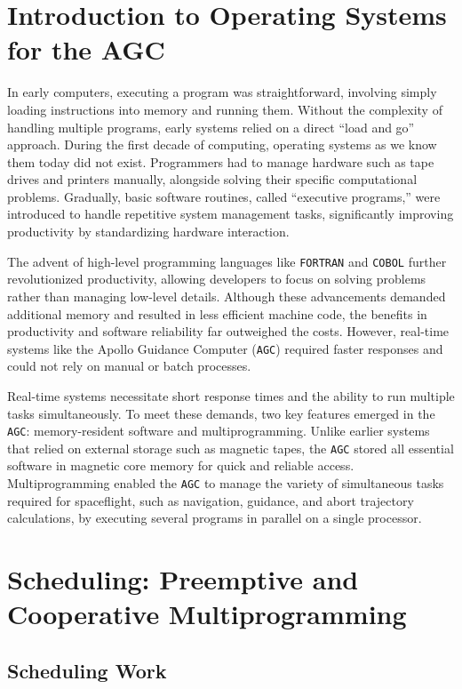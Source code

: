 \documentclass[refcap, oxford]{ahsan}
\begin{document}
\fi     

\section{Introduction to Operating Systems for the AGC}

In early computers, executing a program was straightforward, involving simply loading instructions into memory and running them. Without the complexity of handling multiple programs, early systems relied on a direct ``load and go'' approach. During the first decade of computing, operating systems as we know them today did not exist. Programmers had to manage hardware such as tape drives and printers manually, alongside solving their specific computational problems. Gradually, basic software routines, called ``executive programs,'' were introduced to handle repetitive system management tasks, significantly improving productivity by standardizing hardware interaction.

The advent of high-level programming languages like \texttt{FORTRAN} and \texttt{COBOL} further revolutionized productivity, allowing developers to focus on solving problems rather than managing low-level details. Although these advancements demanded additional memory and resulted in less efficient machine code, the benefits in productivity and software reliability far outweighed the costs. However, real-time systems like the Apollo Guidance Computer (\texttt{AGC}) required faster responses and could not rely on manual or batch processes. 

Real-time systems necessitate short response times and the ability to run multiple tasks simultaneously. To meet these demands, two key features emerged in the \texttt{AGC}: memory-resident software and multiprogramming. Unlike earlier systems that relied on external storage such as magnetic tapes, the \texttt{AGC} stored all essential software in magnetic core memory for quick and reliable access. Multiprogramming enabled the \texttt{AGC} to manage the variety of simultaneous tasks required for spaceflight, such as navigation, guidance, and abort trajectory calculations, by executing several programs in parallel on a single processor.

\section{Scheduling: Preemptive and Cooperative Multiprogramming}

\subsection{Scheduling Work}
\end{document}
